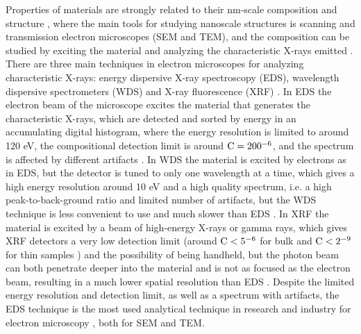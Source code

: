 Properties of materials are strongly related to their nm-scale composition and structure , where the main tools for studying nanoscale structures is scanning and transmission electron microscopes (SEM and TEM), and the composition can be studied by exciting the material and analyzing the characteristic X-rays emitted \cite{goldstein_scanning_2018,carter2016transmission}.
There are three main techniques in electron microscopes for analyzing characteristic X-rays: energy dispersive X-ray spectroscopy (EDS), wavelength dispersive spectrometers (WDS) and X-ray fluorescence (XRF) \cite{jenkins_xrayspectroscopy}.
In EDS the electron beam of the microscope excites the material that generates the characteristic X-rays, which are detected and sorted by energy in an accumulating digital histogram, where the energy resolution is limited to around 120 eV, the compositional detection limit is around $\textnormal{C}=200^{-6}$, and the spectrum is affected by different artifacts \cite{goldstein_scanning_2018}.
In WDS the material is excited by electrons as in EDS, but the detector is tuned to only one wavelength at a time, which gives a high energy resolution around 10 eV and a high quality spectrum, i.e. a high peak-to-back-ground ratio and limited number of artifacts, but the WDS technique is less convenient to use and much slower than EDS .
In XRF the material is excited by a beam of high-energy X-rays or gamma rays, which gives XRF detectors a very low detection limit (around $\textnormal{C}<5^{-6}$ for bulk and $\textnormal{C}<2^{-9}$ for thin samples \cite[Ch. 13.3.5]{xrf_detection_limit}) and the possibility of being handheld, but the photon beam can both penetrate deeper into the material and is not as focused as the electron beam, resulting in a much lower spatial resolution than EDS \cite{xrf_spatial_resolution}.
Despite the limited energy resolution and detection limit, as well as a spectrum with artifacts, the EDS technique is  the most used analytical technique in research and industry for electron microscopy , both for SEM and TEM.








